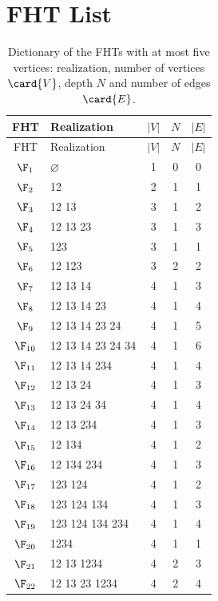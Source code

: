 \section{FHT List}\label{sec:FHT_list}

{\setlength{\tabcolsep}{6pt}\small
\begin{longtable}{c p{7cm} c c c}
\caption{Dictionary of the FHTs with at most five vertices: realization, number of vertices $\card{V}$, depth $N$ and number of edges $\card{E}$.}\label{tab:fht_list}\\
\toprule
FHT & Realization & $\lvert V\rvert$ & $N$ & $\lvert E\rvert$ \\
\midrule
\endfirsthead
\toprule
FHT & Realization & $\lvert V\rvert$ & $N$ & $\lvert E\rvert$ \\
\midrule
\endhead
$\F_{1}$ & $\varnothing$ & 1 & 0 & 0 \\
\midrule
$\F_{2}$ & 12 & 2 & 1 & 1 \\
\midrule
$\F_{3}$ & 12 13 & 3 & 1 & 2 \\
$\F_{4}$ & 12 13 23 & 3 & 1 & 3 \\
$\F_{5}$ & 123 & 3 & 1 & 1 \\
\midrule
$\F_{6}$ & 12 123 & 3 & 2 & 2 \\
\midrule
$\F_{7}$ & 12 13 14 & 4 & 1 & 3 \\
$\F_{8}$ & 12 13 14 23 & 4 & 1 & 4 \\
$\F_{9}$ & 12 13 14 23 24 & 4 & 1 & 5 \\
$\F_{10}$ & 12 13 14 23 24 34 & 4 & 1 & 6 \\
$\F_{11}$ & 12 13 14 234 & 4 & 1 & 4 \\
$\F_{12}$ & 12 13 24 & 4 & 1 & 3 \\
$\F_{13}$ & 12 13 24 34 & 4 & 1 & 4 \\
$\F_{14}$ & 12 13 234 & 4 & 1 & 3 \\
$\F_{15}$ & 12 134 & 4 & 1 & 2 \\
$\F_{16}$ & 12 134 234 & 4 & 1 & 3 \\
$\F_{17}$ & 123 124 & 4 & 1 & 2 \\
$\F_{18}$ & 123 124 134 & 4 & 1 & 3 \\
$\F_{19}$ & 123 124 134 234 & 4 & 1 & 4 \\
$\F_{20}$ & 1234 & 4 & 1 & 1 \\
\midrule
$\F_{21}$ & 12 13 1234 & 4 & 2 & 3 \\
$\F_{22}$ & 12 13 23 1234 & 4 & 2 & 4 \\

\end{longtable}}
